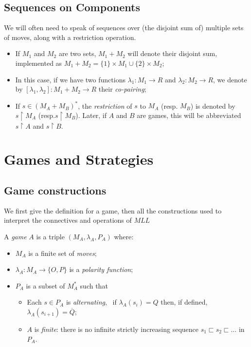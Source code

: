 \subsection{Sequences on Components}\label{sequences-on-components}

We will often need to speak of sequences over (the disjoint sum of)
multiple sets of moves, along with a restriction operation.

\begin{itemize}
\item If \(M_1\) and \(M_2\) are two sets, \(M_1 + M_2\) will denote their
  disjoint sum, implemented as
  \(M_1 + M_2 = \{1\}\times M_1 \cup \{2\}\times M_2\);
\item In this case, if we have two functions \(\lambda_1:M_1 \to R\) and
  \(\lambda_2:M_2\to R\), we denote by
  \([\lambda_1,\lambda_2]:M_1 + M_2 \to R\) their \emph{co-pairing};
\item If \(s\in (M_A + M_B)^*\), the \emph{restriction} of \(s\) to
  \(M_A\) (resp. \(M_B\)) is denoted by \(s\upharpoonright M_A\)
  (resp.\(s \upharpoonright M_B\)). Later, if \(A\) and \(B\) are games,
  this will be abbreviated \(s\upharpoonright A\) and
  \(s\upharpoonright B\).
\end{itemize}

\section{Games and Strategies}\label{games-and-strategies}

\subsection{Game constructions}\label{game-constructions}

We first give the definition for a game, then all the constructions used
to interpret the connectives and operations of \(MLL\)

\begin{definition}[Games]
A \emph{game} $ A$ is a triple $(M_A,\lambda_A,P_A)$ where:
\begin{itemize}
\item $M_A$ is a finite set of \emph{moves};
\item $\lambda_A: M_A \to \{O,P\}$ is a \emph{polarity function};
\item $P_A$ is a subset of $M_A^*$ such that
  \begin{itemize}
  \item Each $s\in P_A$ is \emph{alternating}, \ie\ if $\lambda_A (s_i) = Q$ then, if defined, $\lambda_A(s_{i+1}) = \overline{Q}$;
  \item $A$ is \emph{finite}: there is no infinite strictly increasing sequence $s_1 \sqsubset s_2 \sqsubset \dots $ in $P_A$.
  \end{itemize}
\end{itemize}
\end{definition}

